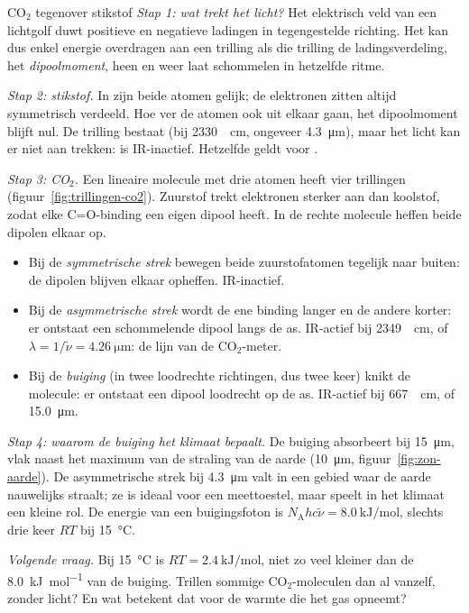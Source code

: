 \begin{casusuitgewerkt}{CO$_2$ tegenover stikstof}
\emph{Stap 1: wat trekt het licht?} Het elektrisch veld van een lichtgolf duwt positieve en negatieve ladingen in tegengestelde richting. Het kan dus enkel energie overdragen aan een trilling als die trilling de ladingsverdeling, het \emph{dipoolmoment}, heen en weer laat schommelen in hetzelfde ritme.

\emph{Stap 2: stikstof.} In  zijn beide atomen gelijk; de elektronen zitten altijd symmetrisch verdeeld. Hoe ver de atomen ook uit elkaar gaan, het dipoolmoment blijft nul. De trilling bestaat (bij \SI{2330}{\per\centi\metre}, ongeveer \SI{4.3}{\micro\metre}), maar het licht kan er niet aan trekken:  is IR-inactief. Hetzelfde geldt voor .

\emph{Stap 3: CO$_2$.} Een lineaire molecule met drie atomen heeft vier trillingen (figuur~\ref{fig:trillingen-co2}). Zuurstof trekt elektronen sterker aan dan koolstof, zodat elke C=O-binding een eigen dipool heeft. In de rechte molecule heffen beide dipolen elkaar op.
\begin{itemize}
\item Bij de \emph{symmetrische strek} bewegen beide zuurstofatomen tegelijk naar buiten: de dipolen blijven elkaar opheffen. IR-inactief.
\item Bij de \emph{asymmetrische strek} wordt de ene binding langer en de andere korter: er ontstaat een schommelende dipool langs de as. IR-actief bij \SI{2349}{\per\centi\metre}, of $\lambda = 1/\tilde\nu = \SI{4.26}{\micro\metre}$: de lijn van de CO$_2$-meter.
\item Bij de \emph{buiging} (in twee loodrechte richtingen, dus twee keer) knikt de molecule: er ontstaat een dipool loodrecht op de as. IR-actief bij \SI{667}{\per\centi\metre}, of \SI{15.0}{\micro\metre}.
\end{itemize}

\emph{Stap 4: waarom de buiging het klimaat bepaalt.} De buiging absorbeert bij \SI{15}{\micro\metre}, vlak naast het maximum van de straling van de aarde (\SI{10}{\micro\metre}, figuur~\ref{fig:zon-aarde}). De asymmetrische strek bij \SI{4.3}{\micro\metre} valt in een gebied waar de aarde nauwelijks straalt; ze is ideaal voor een meettoestel, maar speelt in het klimaat een kleine rol. De energie van een buigingsfoton is $N_\mathrm{A}hc\tilde\nu = \SI{8.0}{\kilo\joule\per\mole}$, slechts drie keer $RT$ bij \SI{15}{\celsius}.

\emph{Volgende vraag.} Bij \SI{15}{\celsius} is $RT = \SI{2.4}{\kilo\joule\per\mole}$, niet zo veel kleiner dan de \SI{8.0}{\kilo\joule\per\mole} van de buiging. Trillen sommige CO$_2$-moleculen dan al vanzelf, zonder licht? En wat betekent dat voor de warmte die het gas opneemt?
\end{casusuitgewerkt}

